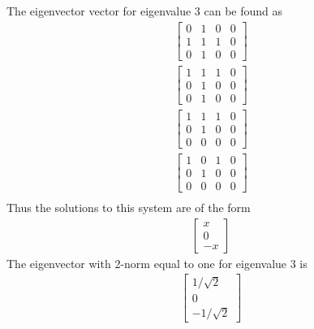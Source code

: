 \documentclass[11pt]{article}
\begin{document}
\begin{enumerate}
\begin{enumerate}
                The eigenvector vector for eigenvalue 3 can be found as
                \begin{align*}
                    \begin{bmatrix}
                        0 & 1 & 0 & 0 \\
                        1 & 1 & 1 & 0 \\
                        0 & 1 & 0 & 0
                    \end{bmatrix} \\
                    \begin{bmatrix}
                        1 & 1 & 1 & 0 \\
                        0 & 1 & 0 & 0 \\
                        0 & 1 & 0 & 0
                    \end{bmatrix} \\
                    \begin{bmatrix}
                        1 & 1 & 1 & 0 \\
                        0 & 1 & 0 & 0 \\
                        0 & 0 & 0 & 0
                    \end{bmatrix} \\
                    \begin{bmatrix}
                        1 & 0 & 1 & 0 \\
                        0 & 1 & 0 & 0 \\
                        0 & 0 & 0 & 0
                    \end{bmatrix} \\
                \end{align*}
                Thus the solutions to this system are of the form
                \begin{align*}
                    \begin{bmatrix}
                        x \\
                        0 \\
                        -x
                    \end{bmatrix}
                \end{align*}
                The eigenvector with 2-norm equal to one for eigenvalue 3 is
                \begin{align*}
                    \begin{bmatrix}
                        1/\sqrt{2} \\
                        0 \\
                        -1/\sqrt{2}
                    \end{bmatrix}
                \end{align*}


\end{enumerate}
\end{enumerate}
\end{document}
